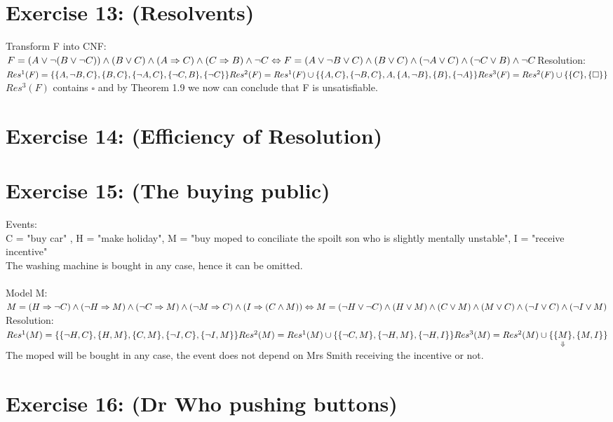 \documentclass[12pt]{article}
\begin{document}
 

\rhead{\today}


\section*{Exercise 13:  (Resolvents)}
Transform F into CNF:\\
$F = (A \lor \lnot(B \lor \lnot C)) \land (B \lor C) \land (A \Rightarrow C) \land (C \Rightarrow B) \land \lnot C \\
\Leftrightarrow F = (A \lor \lnot B \lor C) \land (B \lor C) \land (\lnot A \lor C) \land (\lnot C \lor B) \land \lnot C\\ \\
$Resolution:\\$
Res^1(F) = \{ \{A, \lnot B, C \},\{B,C\},\{\lnot A, C\},\{\lnot C, B\},\{ \lnot C\}   \}\\
Res^2(F) = Res^1(F) \cup \{\{A, C\},\{\lnot B, C\},{A},\{A, \lnot B\},\{B\},\{\lnot A\}     \}  \\
Res^3(F) = Res^2(F) \cup \{ \{C\},\{\square \} \} \\ \\
$
$Res^3(F)$ contains $\square$ and by Theorem 1.9 we now can conclude that F is unsatisfiable.


\section*{Exercise 14: (Efficiency of Resolution)}

\section*{Exercise 15: (The buying public)}
Events: \\
C = "buy car" , H = "make holiday", M = "buy moped to conciliate the spoilt son who is slightly mentally unstable", I = "receive incentive"\\
The washing machine is bought in any case, hence it can be omitted.\\ \\
Model M:\\
$M = (H \Rightarrow \lnot C) \land (\lnot H \Rightarrow M) \land (\lnot C \Rightarrow M) \land (\lnot M \Rightarrow C) \land (I \Rightarrow (C \land M))\\
\Leftrightarrow M = (\lnot H \lor \lnot C) \land (H \lor M) \land (C \lor M) \land (M \lor C) \land (\lnot I \lor C) \land (\lnot I \lor M)\\ \\
$Resolution:\\$
Res^1(M) = \{\{\lnot H, C\},\{H, M\},\{C,M\},\{\lnot I, C\},\{\lnot I, M\}\} \\
Res^2(M) = Res^1(M) \cup \{\{\lnot C, M\},\{\lnot H, M\},\{\lnot H, I\}\} \\
Res^3(M) = Res^2(M) \cup \{ \underset{\Downarrow}{\{M\}}, \{M, I\}\} \\
$
The moped will be bought in any case, the event does not depend on Mrs Smith receiving the incentive or not.

\section*{Exercise 16: (Dr Who pushing buttons)}

\end{document}
